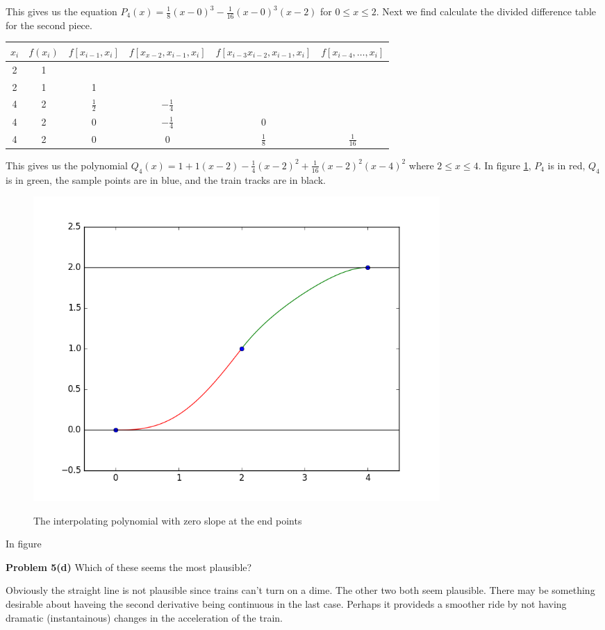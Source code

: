 \documentclass[12pt]{article}
\newcommand{\problem}[1]{\hspace{-4 ex} \large \textbf{Problem #1} }
\begin{document}
	This gives us the equation $P_4(x) = \tfrac{1}{8}(x-0)^3 - \tfrac{1}{16}(x-0)^3(x-2)$ for $0 \leq x \leq 2$. Next we find calculate the divided difference table for the second piece.
	\begin{center}
		\begin{tabular}{|c|c|c|c|c|c|}\hline
			$x_i$ & $f(x_i)$ & $f[x_{i-1},x_i]$ & $f[x_{x-2}, x_{i-1}, x_i]$ & $f[ x_{i-3}x_{i-2}, x_{i-1}, x_i]$ & $f[ x_{i-4},\dots, x_i]$ \\ \hline
			2 & 1 & & & & \\ \hline
			2 & 1 & 1 & & & \\ \hline
			4 & 2 & $\tfrac{1}{2}$ & $-\tfrac{1}{4}$ & & \\ \hline
			4 & 2 & 0 & $-\tfrac{1}{4}$ & 0 & \\ \hline
			4 & 2 & 0 &  0 & $\tfrac{1}{8}$ & $\tfrac{1}{16}$ \\ \hline
		\end{tabular}
	\end{center}
	This gives us the polynomial $Q_4(x) = 1 + 1(x-2) - \tfrac{1}{4}(x-2)^2 + \tfrac{1}{16}(x-2)^2(x-4)^2$ where $2 \leq x \leq 4$. In figure \ref{fig:p5c}, $P_4$ is in red, $Q_4$ is in green, the sample points are in blue, and the train tracks are in black. \bigbreak
	\begin{figure}[H]
		\caption{The interpolating polynomial with zero slope at the end points}
		\includegraphics[width=0.75\textwidth]{hw4_figure_7}
		\centering
		\label{fig:p5c}
	\end{figure}
	In figure 

\problem{5(d)} Which of these seems the most plausible?

	Obviously the straight line is not plausible since trains can't turn on a dime. The other two both seem plausible. There may be something desirable about haveing the second derivative being continuous in the last case. Perhaps it provideds a smoother ride by not having dramatic (instantainous) changes in the acceleration of the train.	
\end{document}
